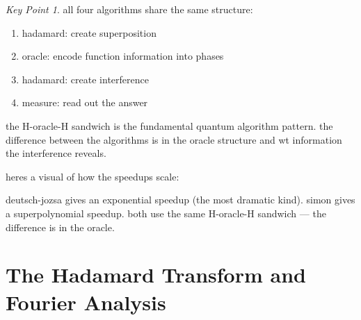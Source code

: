 \documentclass[11pt,a4paper]{article}
\theoremstyle{definition}
\theoremstyle{remark}
\newtheorem*{keypoint}{Key Point}
\begin{document}
\begin{keypoint}
all four algorithms share the same structure:
\begin{enumerate}
    \item hadamard: create superposition
    \item oracle: encode function information into phases
    \item hadamard: create interference
    \item measure: read out the answer
\end{enumerate}
the H-oracle-H sandwich is the fundamental quantum algorithm pattern. the difference between the algorithms is in the oracle structure and wt information the interference reveals.
\end{keypoint}

heres a visual of how the speedups scale:

\begin{center}
\end{center}

deutsch-jozsa gives an exponential speedup (the most dramatic kind). simon gives a superpolynomial speedup. both use the same H-oracle-H sandwich --- the difference is in the oracle.

\section{The Hadamard Transform and Fourier Analysis}
\end{document}
